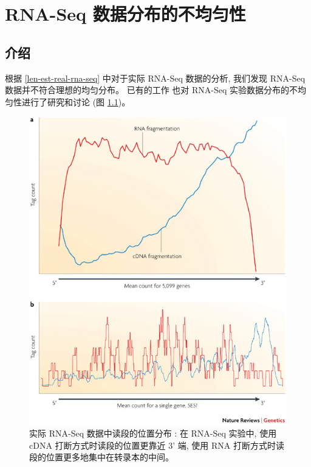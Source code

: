 \chapter{RNA-Seq 数据分布的不均匀性}
\label{chap-rna-seq-nonunif}

\section{介绍}
根据 \ref{len-est-real-rna-seq} 中对于实际 RNA-Seq 数据的分析, 
我们发现 RNA-Seq 数据并不符合理想的均匀分布。 
已有的工作 
\cite{oshlack2009transcript,roberts2011improving, 
20132535, 21176179,20167110,li2010rna} 
也对 RNA-Seq 实验数据分布的不均匀性进行了研究和讨论
 (图 \ref{rna-seq-bias})。 

\begin{figure}[!t]
\centering
\includegraphics[width=\textwidth]{figures/nonunif/rna-seq-bias.jpg}
\caption[实际 RNA-Seq 数据中读段的位置分布 \cite{wang2009rna}]
{实际 RNA-Seq 数据中读段的位置分布 \cite{wang2009rna}: 
在 RNA-Seq 实验中, 使用 cDNA 打断方式时读段的位置更靠近 3' 端, 
使用 RNA 打断方式时读段的位置更多地集中在转录本的中间。}
\label{rna-seq-bias}
\end{figure}

